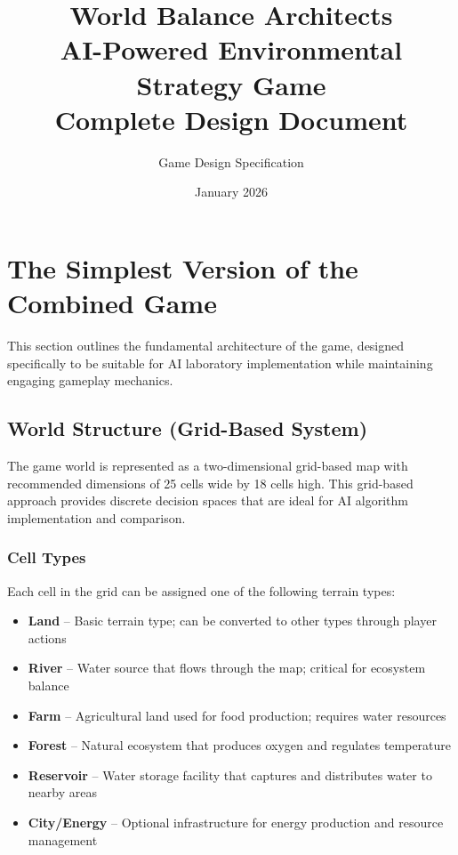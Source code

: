 \documentclass[12pt,a4paper]{article}
\title{
    \Huge\textbf{World Balance Architects} \\
    \vspace{0.5cm}
    \Large AI-Powered Environmental Strategy Game \\
    \vspace{0.3cm}
    \large Complete Design Document
}
\author{Game Design Specification}
\date{January 2026}
\begin{document}
\maketitle
\thispagestyle{empty}

\newpage
\tableofcontents
\newpage

\section{The Simplest Version of the Combined Game}

This section outlines the fundamental architecture of the game, designed specifically to be suitable for AI laboratory implementation while maintaining engaging gameplay mechanics.

\subsection{World Structure (Grid-Based System)}

The game world is represented as a two-dimensional grid-based map with recommended dimensions of 25 cells wide by 18 cells high. This grid-based approach provides discrete decision spaces that are ideal for AI algorithm implementation and comparison.

\subsubsection{Cell Types}

Each cell in the grid can be assigned one of the following terrain types:

\begin{itemize}[leftmargin=2cm]
    \item \textbf{Land} -- Basic terrain type; can be converted to other types through player actions
    \item \textbf{River} -- Water source that flows through the map; critical for ecosystem balance
    \item \textbf{Farm} -- Agricultural land used for food production; requires water resources
    \item \textbf{Forest} -- Natural ecosystem that produces oxygen and regulates temperature
    \item \textbf{Reservoir} -- Water storage facility that captures and distributes water to nearby areas
    \item \textbf{City/Energy} -- Optional infrastructure for energy production and resource management
\end{itemize}
\end{document}

